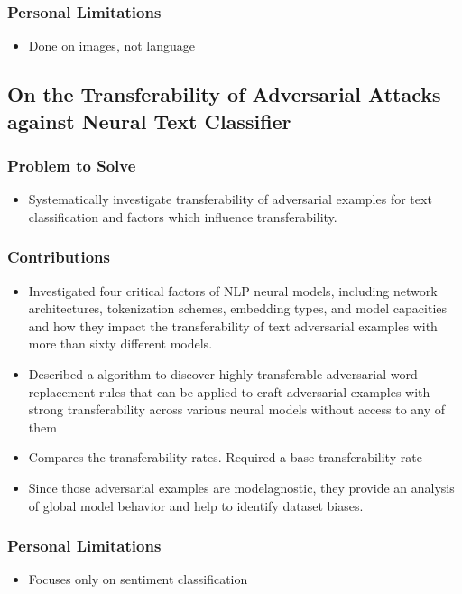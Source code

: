 \documentclass{article}
\begin{document}
\begin{flushleft}
\subsubsection*{Personal Limitations}
\begin{itemize}
    \item Done on images, not language 
\end{itemize}






\subsection{On the Transferability of Adversarial Attacks against Neural Text Classifier   \cite{yuan2020transferability}} 
\subsubsection*{Problem to Solve}
\begin{itemize}
    \item Systematically investigate transferability of adversarial examples for text classification and factors which influence transferability. 
\end{itemize}

\subsubsection*{Contributions}
\begin{itemize}
  \item  Investigated four critical factors of NLP neural models, including network architectures, tokenization schemes, embedding types, and model capacities and how they impact the transferability of text adversarial examples with more than sixty different models.
  \item Described a algorithm to discover highly-transferable adversarial word replacement rules that can be applied to craft adversarial examples with strong transferability across various neural models without access to any of them
  \item Compares the transferability rates. Required a base transferability rate
  \item Since those adversarial examples are modelagnostic, they provide an analysis of global model behavior and help to identify dataset biases.
\end{itemize}

\subsubsection*{Personal Limitations}
\begin{itemize}
    \item Focuses only on sentiment classification 
\end{itemize}



\end{flushleft}
\end{document}
